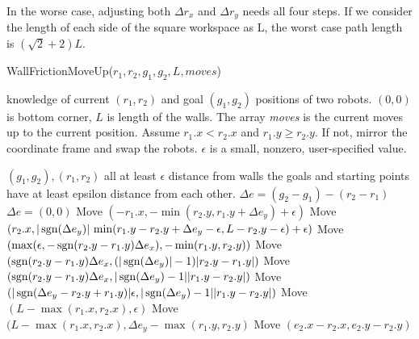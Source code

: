 In the worse case, adjusting both $\Delta r_x$ and $\Delta r_y$ needs all four steps. If we consider the length of each side of the square workspace as L, the worst case path length is $(\sqrt{2}+2)L$.





\begin{algorithm}
\caption{WallFrictionMoveUp($r_1,r_2,g_1,g_2,L, moves$)}\label{alg:Wallup}
\begin{algorithmic}[1]
\scriptsize
\Require knowledge of current $(r_1,r_2)$ and goal $(g_1,g_2)$ positions of  two robots. 
$(0,0)$ is bottom corner,
 $L$ is length of the walls. 
 The array \emph{moves} is the current moves up to the current position.
 Assume $r_1.x < r_2.x$ and $r_1.y \geq r_2.y$. If not, mirror the coordinate frame and swap the robots.
 $\epsilon $ is a small, nonzero, user-specified value.
 
\Ensure $(g_1, g_2) , (r_1, r_2)$ all at least $\epsilon$ distance from walls the goals and starting points have at least epsilon distance from each other.
\State $\Delta e = (g_2 - g_1)- (r_2- r_1)$
\If $\Delta e = (0,0)$
\State 
\EndIf
\State Move $\left(-r_1.x , -\min \left(r_2.y , r_1.y+ \Delta e_y \right)+\epsilon \right)$ 
\State Move $ (r_2.x, |\operatorname{sgn}(\Delta e_y)| \, \min(r_1.y - r_2.y + \Delta e_y-\epsilon,L-r_2.y-\epsilon)+ \epsilon)$
\Statex {}
\State Move $(\max(\epsilon, -\operatorname{sgn}(r_2.y - r_1.y)\Delta e_x), -\min(r_1.y , r_2.y))$ 
\Statex {}
\State Move $(\operatorname{sgn}(r_2.y - r_1.y)\Delta e_x , (|\operatorname{sgn}(\Delta e_y)|-1) |r_2.y - r_1.y|)$ 
\State Move $(\operatorname{sgn}(r_2.y- r_1.y)\Delta e_x, |\operatorname{sgn}(\Delta e_y)-1| |r_1.y-r_2.y|)$ 
\Else
\State Move  $(|\operatorname{sgn}(\Delta e_y -r_2.y+ r_1.y)| \epsilon, |\operatorname{sgn}(\Delta e_y)-1| |r_1.y-r_2.y|)$ 
\EndIf
\State Move $(L - \max(r_1.x, r_2.x), \epsilon)$
\Else 
\State Move $(L - \max(r_1.x, r_2.x),\Delta e_y -\max(r_1.y, r_2.y)$ 
\Statex {}
\EndIf
\EndIf
\State Move $(e_2.x - r_2.x, e_2.y - r_2.y)$ 
\end{algorithmic}
\end{algorithm}






